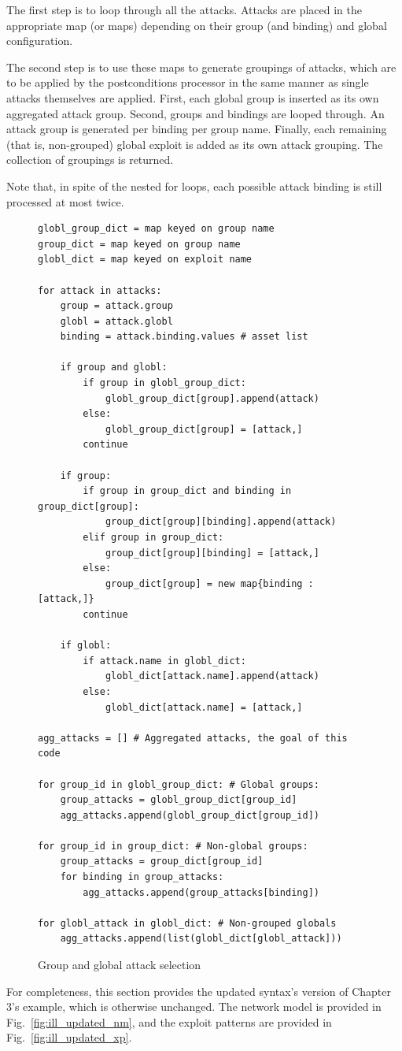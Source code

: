 The first step is to loop through all the attacks. Attacks are placed in the
appropriate map (or maps) depending on their group (and binding) and global
configuration.

The second step is to use these maps to generate groupings of attacks, which
are to be applied by the postconditions processor in the same manner as single
attacks themselves are applied. First, each global group is inserted as its
own aggregated attack group. Second, groups and bindings are looped through. An
attack group is generated per binding per group name. Finally,
each remaining (that is, non-grouped) global exploit is
added as its own attack grouping. The collection of groupings is returned.

Note that, in spite of the nested for loops, each possible attack binding is
still processed at most twice.
\begin{figure}
\begin{lstlisting}
globl_group_dict = map keyed on group name
group_dict = map keyed on group name
globl_dict = map keyed on exploit name

for attack in attacks:
    group = attack.group
    globl = attack.globl
    binding = attack.binding.values # asset list
    
    if group and globl:
        if group in globl_group_dict:
            globl_group_dict[group].append(attack)
        else:
            globl_group_dict[group] = [attack,]
        continue

    if group:
        if group in group_dict and binding in group_dict[group]:
            group_dict[group][binding].append(attack)
        elif group in group_dict:
            group_dict[group][binding] = [attack,]
        else:
            group_dict[group] = new map{binding : [attack,]}
        continue
        
    if globl:
        if attack.name in globl_dict:
            globl_dict[attack.name].append(attack)
        else:
            globl_dict[attack.name] = [attack,]

agg_attacks = [] # Aggregated attacks, the goal of this code

for group_id in globl_group_dict: # Global groups:
    group_attacks = globl_group_dict[group_id]
    agg_attacks.append(globl_group_dict[group_id])

for group_id in group_dict: # Non-global groups:
    group_attacks = group_dict[group_id]
    for binding in group_attacks:
        agg_attacks.append(group_attacks[binding])

for globl_attack in globl_dict: # Non-grouped globals
    agg_attacks.append(list(globl_dict[globl_attack]))
\end{lstlisting}
\caption{Group and global attack selection}
\label{fig:cpe_glgr_precondition_pc}
\end{figure}
For completeness, this section provides the updated syntax's version of
Chapter 3's example, which is otherwise unchanged. The network model is
provided in Fig.~\ref{fig:ill_updated_nm}, and the exploit patterns are
provided in Fig.~\ref{fig:ill_updated_xp}.

